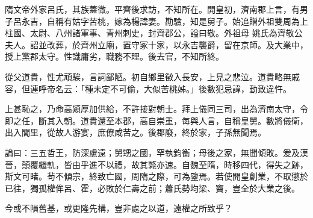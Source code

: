 \begin{pinyinscope}
 隋文帝外家呂氏，其族蓋微。平齊後求訪，不知所在。開皇初，濟南郡上言，有男子呂永吉，自稱有姑字苦桃，嫁為楊諱妻。勘驗，知是舅子。始追贈外祖雙周為上柱國、太尉、八州諸軍事、青州刺史，封齊郡公，謚曰敬。外祖母
 姚氏為齊敬公夫人。詔並改葬，於齊州立廟，置守冢十家，以永吉襲爵，留在京師。及大業中，授上黨郡太守。性識庸劣，職務不理。後去官，不知所終。



 從父道貴，性尤頑騃，言詞鄙陋。初自鄉里徵入長安，上見之悲泣。道貴略無戚容，但連呼帝名云：「種未定不可偷，大似苦桃姊。」後數犯忌諱，動致違忤。



 上甚恥之，乃命高熲厚加供給，不許接對朝士。拜上儀同三司，出為濟南太守，令即之任，斷其入朝。道貴還至本郡，高自崇重，每與人言，自稱皇舅。數將儀衛，出入閭里，從故人游宴，庶僚咸苦之。後郡廢，終於家，子孫無聞焉。



 論曰：三五哲王，防深慮遠；舅甥之國，罕執鈞衡；母後之家，無聞傾敗。爰及漢晉，顛覆繼軌，皆由乎進不以禮，故其斃亦速。自魏至隋，時移四代，得失之跡，斯文可睹。茍不傾宗，終致亡國，周隋之際，可為鑒焉。若使開皇創業，不取懲於已往，獨孤權侔呂、霍，必敗於仁壽之前；蕭氏勢均梁、竇，豈全於大業之後。



 今或不隕舊基，或更隆先構，豈非處之以道，遠權之所致乎？



\end{pinyinscope}